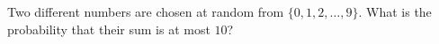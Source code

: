 Two different numbers are chosen at random from $\{0,1,2,\dots,9\}$. What is the probability that their sum is at most $10$?

